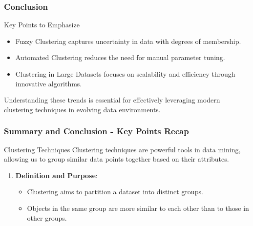 \documentclass[aspectratio=169]{beamer}
\begin{document}
\begin{frame}[fragile]
    \frametitle{Conclusion}
    \begin{block}{Key Points to Emphasize}
        \begin{itemize}
            \item Fuzzy Clustering captures uncertainty in data with degrees of membership.
            \item Automated Clustering reduces the need for manual parameter tuning.
            \item Clustering in Large Datasets focuses on scalability and efficiency through innovative algorithms.
        \end{itemize}
    \end{block}
    Understanding these trends is essential for effectively leveraging modern clustering techniques in evolving data environments.
\end{frame}

\begin{frame}[fragile]
    \frametitle{Summary and Conclusion - Key Points Recap}
    \begin{block}{Clustering Techniques}
        Clustering techniques are powerful tools in data mining, allowing us to group similar data points together based on their attributes.
    \end{block}
    \begin{enumerate}
        \item \textbf{Definition and Purpose}:
        \begin{itemize}
            \item Clustering aims to partition a dataset into distinct groups.
            \item Objects in the same group are more similar to each other than to those in other groups.
        \end{itemize}
    \end{enumerate}
\end{frame}
\end{document}
